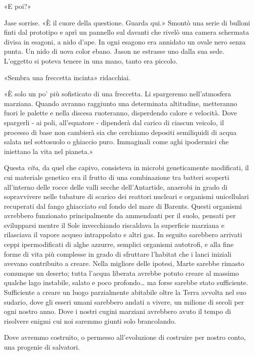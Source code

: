 «E poi?»

Jase sorrise. «È il cuore della questione. Guarda qui.» Smontò una serie
di bulloni finti dal prototipo e aprì un pannello sul davanti che rivelò
una camera schermata divisa in esagoni, a nido d'ape. In ogni esagono
era annidato un ovale nero senza punta. Un nido di uova color ebano.
Jason ne estrasse uno dalla sua sede. L'oggetto si poteva tenere in una
mano, tanto era piccolo.

«Sembra una freccetta incinta» ridacchiai.

«È solo un po' più sofisticato di una freccetta. Li spargeremo
nell'atmosfera marziana. Quando avranno raggiunto una determinata
altitudine, metteranno fuori le palette e nella discesa ruoteranno,
disperdendo calore e velocità. Dove spargerli - ai poli, all'equatore -
dipenderà dal carico di ciascun veicolo, il processo di base non
cambierà sia che cerchiamo depositi semiliquidi di acqua salata nel
sottosuolo o ghiaccio puro. Immaginali come aghi ipodermici che
iniettano la vita nel pianeta.»

Questa \emph{vita}, da quel che capivo, consisteva in microbi
geneticamente modificati, il cui materiale genetico era il frutto di una
combinazione tra batteri scoperti all'interno delle rocce delle valli
secche dell'Antartide, anaerobi in grado di sopravvivere nelle tubature
di scarico dei reattori nucleari e organismi unicellulari recuperati dal
fango ghiacciato sul fondo del mare di Barents. Questi organismi
avrebbero funzionato principalmente da ammendanti per il suolo, pensati
per svilupparsi mentre il Sole invecchiando riscaldava la superficie
marziana e rilasciava il vapore acqueo intrappolato e altri gas. In
seguito sarebbero arrivati ceppi ipermodificati di alghe azzurre,
semplici organismi autotrofi, e alla fine forme di vita più complesse in
grado di sfruttare l'habitat che i lanci iniziali avevano contribuito a
creare. Nella migliore delle ipotesi, Marte sarebbe rimasto comunque un
deserto; tutta l'acqua liberata avrebbe potuto creare al massimo qualche
lago instabile, salato e poco profondo\ldots{} ma forse sarebbe stato
sufficiente. Sufficiente a creare un luogo parzialmente abitabile oltre
la Terra avvolta nel suo sudario, dove gli esseri umani sarebbero andati
a vivere, un milione di secoli per ogni nostro anno. Dove i nostri
cugini marziani avrebbero avuto il tempo di risolvere enigmi cui noi
saremmo giunti solo brancolando.

Dove avremmo costruito, o permesso all'evoluzione di costruire per
nostro conto, una progenie di salvatori.

